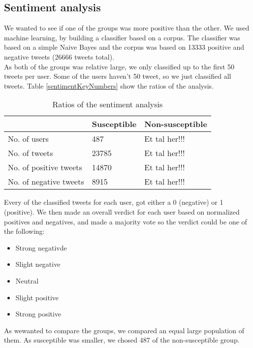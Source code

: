 \documentclass[10pt]{IEEEtran}
\begin{document}
\subsection{Sentiment analysis}
We wanted to see if one of the groups was more positive than the other. We used machine learning, by building a classifier based on a corpus. The classifier was based on a simple Naive Bayes and the corpus was based on 13333 positive and negative tweets (26666 tweets total). \\
As both of the groups was relative large, we only classified up to the first 50 tweets per user. Some of the users haven't 50 tweet, so we just classified all tweets. 
Table \ref{sentimentKeyNumbers} show the ratios of the analysis. 

\begin{table}[h]
\begin{tabular}{lll}
\hline
                       & Susceptible & Non-susceptible \\ \hline
No. of users           & 487         & Et tal her!!!   \\
No. of tweets          & 23785       & Et tal her!!!   \\
No. of positive tweets & 14870       & Et tal her!!!   \\
No. of negative tweets & 8915        & Et tal her!!!   \\ \hline
\end{tabular}
\caption{Ratios of the sentiment analysis}
\label{tab:sentimentKeyNumbers}
\end{table}

Every of the classified tweets for each user, got either a 0 (negative) or 1 (positive). We then made an overall verdict for each user based on normalized positives and negatives, and made a majority vote so the verdict could be one of the following:

\begin{itemize}
  \item Strong negativde
  \item Slight negative
  \item Neutral
  \item Slight positive
  \item Strong positive\\
\end{itemize}

As wewanted to compare the groups, we compared an equal large population of them. As susceptible was smaller, we chosed 487 of the non-susceptible group. \\
\end{document}
